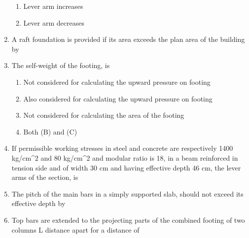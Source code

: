 \documentclass[11pt,a4paper]{article}
\begin{document}
\begin{enumerate}
\begin{enumerate}[label=\Alph*.]
\item{Lever arm increases}
\item{Lever arm decreases}
\end{enumerate}
\item{A raft foundation is provided if its area exceeds the plan area of the building by}
\\
\item{The self-weight of the footing, is}
\begin{enumerate}[label=\Alph*.]
\item{Not considered for calculating the upward pressure on footing}
\item{Also considered for calculating the upward pressure on footing}
\item{Not considered for calculating the area of the footing}
\item{Both (B) and (C)}
\end{enumerate}
\item{If permissible working stresses in steel and concrete are respectively 1400 kg/cm\^{}2 and 80 kg/cm\^{}2 and modular ratio is 18, in a beam reinforced in tension side and of width 30 cm and having effective depth 46 cm, the lever arms of the section, is
}
\\\begin{enumerate*}[itemjoin=\qquad, label=\Alph*.]
\item{37 cm}
\item{38 cm}
\item{39 cm}
\item{40 cm}
\end{enumerate*}
\item{The pitch of the main bars in a simply supported slab, should not exceed its effective depth by}
\\
\item{Top bars are extended to the projecting parts of the combined footing of two columns L distance apart for a distance of}

\end{enumerate}
\end{document}
